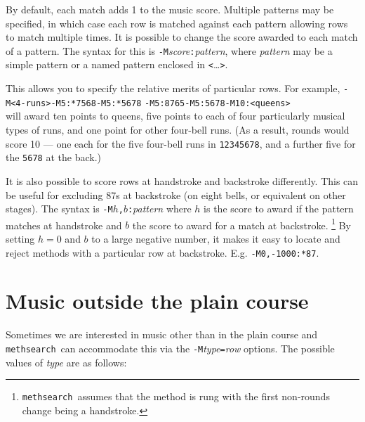 \documentclass[a4paper,11pt,oneside]{book}
\def\methsearch{\texttt{meth\-search}}
\begin{document}
By default, each match adds 1 to the music score.  Multiple patterns
may be specified, in which case each row is matched against each pattern
allowing rows to match multiple times.  It is possible to change the score
awarded to each match of a pattern.  The syntax for this is 
\verb+-M+\textit{score}\verb+:+\textit{pattern}, where \textit{pattern}
may be a simple pattern or a named pattern enclosed in \verb+<+\ldots\verb+>+.

This allows you to specify the relative merits of particular rows.  For 
example, \verb+-M<4-runs>+\hfill\verb+-M5:*7568+\hfill\verb+-M5:*5678+\hfill%
\verb+-M5:8765+\hfill\verb+-M5:5678+\hfill\verb+-M10:<queens>+\\
will award ten points to queens,
five points to each of four particularly musical types of runs, and one point
for other four-bell runs.  (As a result, rounds would score 10 --- one each
for the five four-bell runs in \verb+12345678+, and a further five for 
the \verb+5678+ at the back.)

It is also possible to score rows at handstroke and backstroke differently.
This can be useful for excluding 87s at backstroke (on eight bells, or 
equivalent on other stages).  The syntax is 
\verb+-M+$h$\verb+,+$b$\verb+:+\textit{pattern} where $h$ is the score
to award if the pattern matches at handstroke and 
$b$ the score to award for a match at backstroke.%
\footnote{\methsearch\ assumes that the method is rung with the first 
non-rounds change being a handstroke.}
By setting $h=0$ and $b$ to a large negative number, it makes it easy to locate
and reject methods with a particular row at backstroke.  E.g.
\verb+-M0,-1000:*87+.

\section{Music outside the plain course}\label{muswhere}

Sometimes we are interested in music other than in the plain course
and \methsearch\ can accommodate this via the 
\verb+-M+\textit{type}\verb+=+\textit{row} options.  The possible
values of \textit{type} are as follows:
\end{document}
